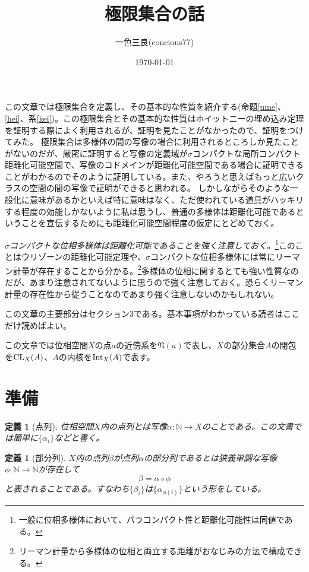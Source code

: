 \documentclass[leqno]{jsarticle}
\title{極限集合の話}
\author{一色三良(concious77)}
\date{\today}
\newtheorem{df}[thm]{定義}
\newcommand{\nn}{\mathbb{N}}
\newcommand{\al}{\alpha}
\newcommand{\be}{\beta}
\newcommand{\cl}{\text{{\rm CL}}}
\newcommand{\nai}{\text{{\rm Int}}}
\begin{document}
\maketitle
この文章では極限集合を定義し、その基本的な性質を紹介する(命題\ref{ume}、\ref{hei}、系\ref{kei})。この極限集合とその基本的な性質はホイットニーの埋め込み定理を証明する際によく利用されるが、証明を見たことがなかったので、証明をつけてみた。
極限集合は多様体の間の写像の場合に利用されるところしか見たことがないのだが、厳密に証明すると写像の定義域が$\sigma$コンパクトな局所コンパクト距離化可能空間で、写像のコドメインが距離化可能空間である場合に証明できることがわかるのでそのように証明している。また、やろうと思えばもっと広いクラスの空間の間の写像で証明ができると思われる。
しかしながらそのような一般化に意味があるかといえば特に意味はなく、ただ使われている道具がハッキリする程度の効能しかないように私は思うし、普通の多様体は距離化可能であるということを宣伝するためにも距離化可能空間程度の仮定にとどめておく。
\par
\emph{$\sigma$コンパクトな位相多様体は距離化可能であることを強く注意しておく。}\footnote{一般に位相多様体において、パラコンパクト性と距離化可能性は同値である。}このことはウリゾーンの距離化可能定理や、$\sigma$コンパクトな位相多様体には常にリーマン計量が存在することから分かる。\footnote{リーマン計量から多様体の位相と両立する距離がおなじみの方法で構成できる。}多様体の位相に関するとても強い性質なのだが、あまり注意されてないように思うので強く注意しておく。恐らくリーマン計量の存在性から従うことなのであまり強く注意しないのかもしれない。
\par
この文章の主要部分はセクション3である。基本事項がわかっている読者はここだけ読めばよい。
\par
この文章では位相空間$X$の点$a$の近傍系を$\mathfrak{N}(a)$で表し、$X$の部分集合$A$の閉包を$\cl_X(A)$、$A$の内核を$\nai_X(A)$で表す。
\section{準備}

\begin{df}[点列]
位相空間$X$内の点列とは写像$\al:\nn\to X$のことである。この文書では簡単に$\{\al_i\}$などと書く。
\end{df}

\begin{df}[部分列]
$X$内の点列$\be$が点列$\al$の部分列であるとは狭義単調な写像$\phi:\nn\to \nn$が存在して
\[
\be=\al \circ \phi
\]
と表されることである。すなわち$\{\beta_i\}$は$\{\al_{\phi(i)}\}$という形をしている。
\end{df}
\end{document}
